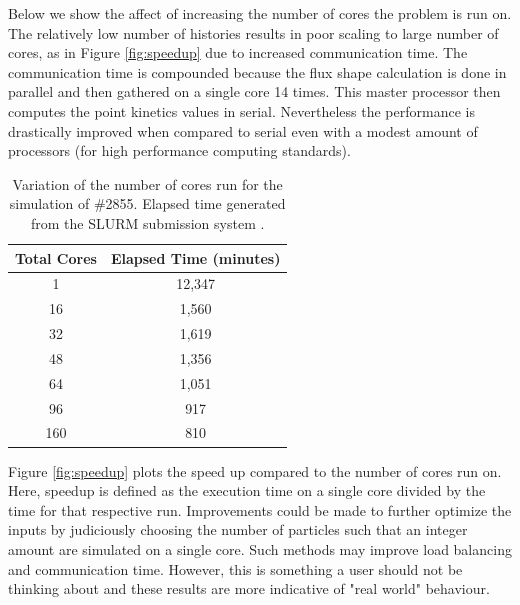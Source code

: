 \documentclass{anstrans}
\begin{document}
Below we show the affect of increasing the number of cores the problem is run on.  The relatively low number of histories results in poor scaling to large number of cores, as in Figure \ref{fig:speedup} due to increased communication time.  The communication time is compounded because the flux shape calculation is done in parallel and then gathered on a single core 14 times.  This master processor then computes the point kinetics values in serial.  Nevertheless the performance is drastically improved when compared to serial even with a modest amount of processors (for high performance computing standards).  
\begin{table}[h]
    \centering
    \begin{tabular}{c|c}
                    Total Cores  & Elapsed Time (minutes) \\
                    \hline 
                    1                  &   12,347            \\
                    16                 &   1,560             \\
                    32                 &   1,619              \\
                    48                 &   1,356              \\
                    64                 &   1,051             \\
                    96                 &   917             \\
                    160                &   810             \\
                    \hline
    \end{tabular}
    \caption{Variation of the number of cores run for the simulation of \#2855. Elapsed time generated from the SLURM submission system \cite{yoo2003slurm}. }
    \label{tab:parallel}
\end{table}

Figure \ref{fig:speedup} plots the speed up compared to the number of cores run on.  Here, speedup is defined as the execution time on a single core divided by the time for that respective run.  Improvements could be made to further optimize the inputs by judiciously choosing the number of particles such that an integer amount are simulated on a single core.  Such methods may improve load balancing and communication time.  However, this is something a user should not be thinking about and these results are more indicative of "real world" behaviour. 
\end{document}
